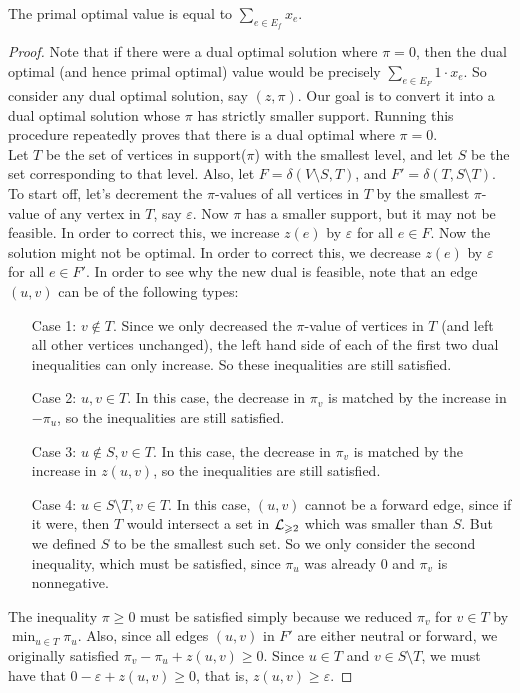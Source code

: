\documentclass[./main.tex]{subfiles}
\begin{document}
	\vspace{2mm}
		\begin{claim}
			The primal optimal value is equal to $\sum_{e\in E_f}x_e$.
		\end{claim}
		\begin{proof}
			Note that if there were a dual optimal solution where $\pi = 0$, then the dual optimal (and hence primal optimal) value would be precisely $\sum_{e\in E_F}1\cdot x_e$.
			So consider any dual optimal solution, say $(z,\pi)$. Our goal is to convert it into a dual optimal solution whose $\pi$ has strictly smaller support.
			Running this procedure repeatedly proves that there is a dual optimal where $\pi = 0$.\\
			\vspace{2mm}
			Let $T$ be the set of vertices in support($\pi$) with the smallest level, and let $S$ be the set corresponding to that level.
			Also, let $F = \delta(V\setminus S, T)$, and $F' = \delta(T,S\setminus T)$.\\

			To start off, let's decrement the $\pi$-values of all vertices in $T$ by the smallest $\pi$-value of any vertex in $T$, say $\varepsilon$. Now $\pi$ has a smaller support, but it may not be feasible. In order to correct this, we increase $z(e)$ by $\varepsilon$ for all $e\in F$. Now the solution might not be optimal. In order to correct this, we decrease $z(e)$ by $\varepsilon$ for all $e\in F'$. In order to see why the new dual is feasible, note that an edge $(u,v)$ can be of the following types:
				\begin{itemize}
					\item[Case 1:] $v\notin T$. Since we only decreased the $\pi$-value of vertices in $T$ (and left all other vertices unchanged), the left hand side of each of the first two dual inequalities can only increase. So these inequalities are still satisfied.
					\item[Case 2:] $u,v\in T$. In this case, the decrease in $\pi_v$ is matched by the increase in $-\pi_u$, so the inequalities are still satisfied.
					\item[Case 3:] $u\notin S, v\in T$. In this case, the decrease in $\pi_v$ is matched by the increase in $z(u,v)$, so the inequalities are still satisfied.
					\item[Case 4:] $u\in S\setminus T, v\in T$. In this case, $(u,v)$ cannot be a forward edge, since if it were, then $T$ would intersect a set in $\mathcal{L}_{\geqslant 2}$ which was smaller than $S$. But we defined $S$ to be the smallest such set. So we only consider the second inequality, which must be satisfied, since $\pi_u$ was already $0$ and $\pi_v$ is nonnegative.
				\end{itemize}
			The inequality $\pi\geqslant 0$ must be satisfied simply because we reduced $\pi_v$ for $v\in T$ by $\min_{u\in T}\pi_u$.
			Also, since all edges $(u,v)$ in $F'$ are either neutral or forward, we originally satisfied $\pi_v - \pi_u + z(u,v)\geqslant 0$. Since $u\in T$ and $v\in S\setminus T$, we must have that $0 - \varepsilon + z(u,v)\geqslant 0$, that is, $z(u,v)\geqslant \varepsilon$.


\end{proof}
\end{document}
